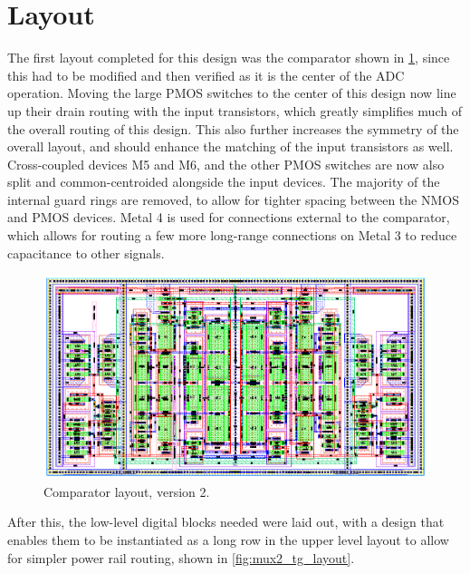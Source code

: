 \documentclass[11pt,letterpaper]{article}
\begin{document}
\section{Layout}

The first layout completed for this design was the comparator shown in \cref{fig:comp_v2_layout}, since this had to be modified and then verified as it is the center of the ADC operation. Moving the large PMOS switches to the center of this design now line up their drain routing with the input transistors, which greatly simplifies much of the overall routing of this design. This also further increases the symmetry of the overall layout, and should enhance the matching of the input transistors as well. Cross-coupled devices M5 and M6, and the other PMOS switches are now also split and common-centroided alongside the input devices. The majority of the internal guard rings are removed, to allow for tighter spacing between the NMOS and PMOS devices. Metal 4 is used for connections external to the comparator, which allows for routing a few more long-range connections on Metal 3 to reduce capacitance to other signals.

\begin{figure}[ht!]
    \centering
    \includegraphics[width=\textwidth]{comp_v2_layout.eps}
    \caption{Comparator layout, version 2.}\label{fig:comp_v2_layout}
\end{figure}

After this, the low-level digital blocks needed were laid out, with a design that enables them to be instantiated as a long row in the upper level layout to allow for simpler power rail routing, shown in \cref{fig:mux2_tg_layout}.
\end{document}
